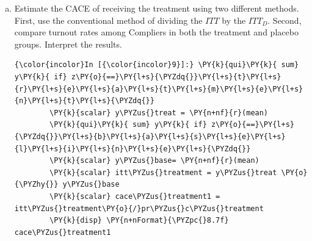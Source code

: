 \documentclass[11pt,notitlepage]{article}\usepackage[]{graphicx}\usepackage[]{color}
\makeatletter
\newenvironment{kframe}{%
 \def\at@end@of@kframe{}%
 \ifinner\ifhmode%
  \def\at@end@of@kframe{\end{minipage}}%
  \begin{minipage}{\columnwidth}%
 \fi\fi%
 \def\FrameCommand##1{\hskip\@totalleftmargin \hskip-\fboxsep
 \colorbox{shadecolor}{##1}\hskip-\fboxsep
     \hskip-\linewidth \hskip-\@totalleftmargin \hskip\columnwidth}%
 \MakeFramed {\advance\hsize-\width
   \@totalleftmargin\z@ \linewidth\hsize
   \@setminipage}}%
 {\par\unskip\endMakeFramed%
 \at@end@of@kframe}
\newenvironment{knitrout}{}{} %
\makeatother
\begin{document}
\begin{enumerate}[a)]
\begin{knitrout}
\begin{kframe}
    \begin{Verbatim}[commandchars=\\\{\}]
{\color{incolor}In [{\color{incolor}8}]:} \PY{c+c1}{//}\PY{c+c1}{ }\PY{c+c1}{E}\PY{c+c1}{s}\PY{c+c1}{t}\PY{c+c1}{i}\PY{c+c1}{m}\PY{c+c1}{a}\PY{c+c1}{t}\PY{c+c1}{e}\PY{c+c1}{ }\PY{c+c1}{t}\PY{c+c1}{h}\PY{c+c1}{e}\PY{c+c1}{ }\PY{c+c1}{C}\PY{c+c1}{A}\PY{c+c1}{C}\PY{c+c1}{E}\PY{c+c1}{ }\PY{c+c1}{o}\PY{c+c1}{f}\PY{c+c1}{ }\PY{c+c1}{r}\PY{c+c1}{e}\PY{c+c1}{c}\PY{c+c1}{e}\PY{c+c1}{i}\PY{c+c1}{v}\PY{c+c1}{i}\PY{c+c1}{n}\PY{c+c1}{g}\PY{c+c1}{ }\PY{c+c1}{t}\PY{c+c1}{h}\PY{c+c1}{e}\PY{c+c1}{ }\PY{c+c1}{p}\PY{c+c1}{l}\PY{c+c1}{a}\PY{c+c1}{c}\PY{c+c1}{e}\PY{c+c1}{b}\PY{c+c1}{o}
        \PY{k}{disp} \PY{n+nFormat}{\PYZpc{}8.3f} cace\PYZus{}placebo
\end{Verbatim}

    \begin{Verbatim}[commandchars=\\\{\}]
   0.027
    \end{Verbatim}

\end{kframe}
\end{knitrout}

The CACE is 0.027. The placebo has an unexpectedly positive effect on turnout (although further analysis shows that the effect is not larger than one would expect due to random sampling variability). The fact that the placebo group has higher turnout than the control group makes the GOTV vs. placebo comparison more conservative.

\item Estimate the CACE of receiving the treatment using two different methods. First, use the conventional method of dividing the $ITT$ by the $ITT_D$. Second, compare turnout rates among Compliers in both the treatment and placebo groups. Interpret the results. \\
\begin{knitrout}
\color{fgcolor}\begin{kframe}
  \begin{Verbatim}[commandchars=\\\{\}]
{\color{incolor}In [{\color{incolor}9}]:} \PY{k}{qui}\PY{k}{ sum} y\PY{k}{ if} z\PY{o}{==}\PY{l+s}{\PYZdq{}}\PY{l+s}{t}\PY{l+s}{r}\PY{l+s}{e}\PY{l+s}{a}\PY{l+s}{t}\PY{l+s}{m}\PY{l+s}{e}\PY{l+s}{n}\PY{l+s}{t}\PY{l+s}{\PYZdq{}}
        \PY{k}{scalar} y\PYZus{}treat = \PY{n+nf}{r}(mean)
        \PY{k}{qui}\PY{k}{ sum} y\PY{k}{ if} z\PY{o}{==}\PY{l+s}{\PYZdq{}}\PY{l+s}{b}\PY{l+s}{a}\PY{l+s}{s}\PY{l+s}{e}\PY{l+s}{l}\PY{l+s}{i}\PY{l+s}{n}\PY{l+s}{e}\PY{l+s}{\PYZdq{}}
        \PY{k}{scalar} y\PYZus{}base= \PY{n+nf}{r}(mean)
        \PY{k}{scalar} itt\PYZus{}treatment = y\PYZus{}treat \PY{o}{\PYZhy{}} y\PYZus{}base
        \PY{k}{scalar} cace\PYZus{}treatment1 = itt\PYZus{}treatment\PY{o}{/}pr\PYZus{}c\PYZus{}treatment
        \PY{k}{disp} \PY{n+nFormat}{\PYZpc{}8.7f} cace\PYZus{}treatment1
\end{Verbatim}


\end{kframe}
\end{knitrout}
\end{enumerate}
\end{document}
